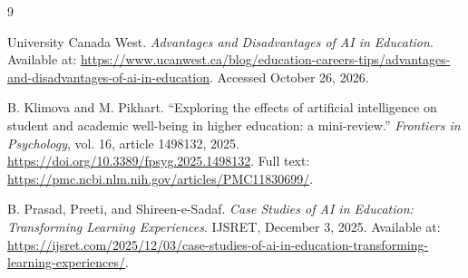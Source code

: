 \documentclass[12pt,a4paper]{article}
\begin{document}
\begin{thebibliography}{9}

University Canada West.
\newblock \emph{Advantages and Disadvantages of AI in Education}.
\newblock Available at: \url{https://www.ucanwest.ca/blog/education-careers-tips/advantages-and-disadvantages-of-ai-in-education}.
\newblock Accessed October 26, 2026.

B. Klimova and M. Pikhart.
\newblock ``Exploring the effects of artificial intelligence on student and academic well-being in higher education: a mini-review.''
\newblock \emph{Frontiers in Psychology}, vol. 16, article 1498132, 2025.
\newblock \url{https://doi.org/10.3389/fpsyg.2025.1498132}.
\newblock Full text: \url{https://pmc.ncbi.nlm.nih.gov/articles/PMC11830699/}.

B. Prasad, Preeti, and Shireen-e-Sadaf.
\newblock \emph{Case Studies of AI in Education: Transforming Learning Experiences}.
\newblock IJSRET, December 3, 2025.
\newblock Available at: \url{https://ijsret.com/2025/12/03/case-studies-of-ai-in-education-transforming-learning-experiences/}.

\end{thebibliography}
\end{document}
